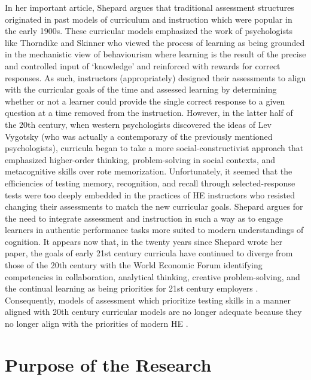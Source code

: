 \documentclass[
]{book}
\begin{document}
In her important article, Shepard \citeyearpar{shepardRoleAssessmentLearning2000} argues that traditional assessment structures originated in past models of curriculum and instruction which were popular in the early 1900s. These curricular models emphasized the work of psychologists like Thorndike and Skinner who viewed the process of learning as being grounded in the mechanistic view of behaviourism where learning is the result of the precise and controlled input of `knowledge' and reinforced with rewards for correct responses. As such, instructors (appropriately) designed their assessments to align with the curricular goals of the time and assessed learning by determining whether or not a learner could provide the single correct response to a given question at a time removed from the instruction. However, in the latter half of the 20th century, when western psychologists discovered the ideas of Lev Vygotsky (who was actually a contemporary of the previously mentioned psychologists), curricula began to take a more social-constructivist approach that emphasized higher-order thinking, problem-solving in social contexts, and metacognitive skills over rote memorization. Unfortunately, it seemed that the efficiencies of testing memory, recognition, and recall through selected-response tests were too deeply embedded in the practices of HE instructors who resisted changing their assessments to match the new curricular goals. Shepard argues for the need to integrate assessment and instruction in such a way as to engage learners in authentic performance tasks more suited to modern understandings of cognition. It appears now that, in the twenty years since Shepard wrote her paper, the goals of early 21st century curricula have continued to diverge from those of the 20th century with the World Economic Forum identifying competencies in collaboration, analytical thinking, creative problem-solving, and the continual learning as being priorities for 21st century employers \citep{worldeconomicforumFutureJobsReport2020}. Consequently, models of assessment which prioritize testing skills in a manner aligned with 20th century curricular models are no longer adequate because they no longer align with the priorities of modern HE \citep{crooksImpactClassroomEvaluation1988}.

\hypertarget{purpose-of-the-research}{%
\section*{Purpose of the Research}\label{purpose-of-the-research}}
\end{document}
